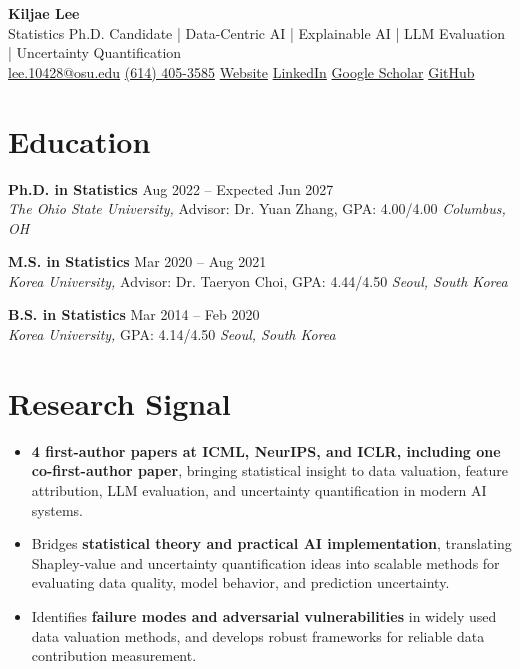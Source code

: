 \documentclass[letterpaper,10pt]{article}
\newcommand{\eduline}[5]{%
  \textbf{#1} \hfill {\color{muted}#2}\\
  \textit{#3}#4 \hfill \textit{#5}\par\vspace{4pt}
}
\begin{document}
{\huge\bfseries Kiljae Lee}\\[2pt]
{\color{accent}Statistics Ph.D. Candidate | Data-Centric AI | Explainable AI | LLM Evaluation | Uncertainty Quantification}\\[3.5pt]
\href{mailto:lee.10428@osu.edu}{lee.10428@osu.edu} \quad
\href{tel:+16144053585}{(614) 405-3585} \quad
\href{https://kiljaeL.github.io}{Website} \quad
\href{https://www.linkedin.com/in/kiljaelee}{LinkedIn} \quad
\href{https://scholar.google.com/citations?user=UsRBPmUAAAAJ&hl=en&oi=sra}{Google Scholar} \quad
\href{https://github.com/kiljael}{GitHub}
\vspace{-4.2pt}

\section{Education}
\eduline
  {Ph.D. in Statistics}
  {Aug 2022 -- Expected Jun 2027}
  {The Ohio State University,}
  { Advisor: Dr. Yuan Zhang, GPA: 4.00/4.00}
  {Columbus, OH}
\eduline
  {M.S. in Statistics}
  {Mar 2020 -- Aug 2021}
  {Korea University,}
  { Advisor: Dr. Taeryon Choi, GPA: 4.44/4.50}
  {Seoul, South Korea}
\eduline
  {B.S. in Statistics}
  {Mar 2014 -- Feb 2020}
  {Korea University,}
  { GPA: 4.14/4.50}
  {Seoul, South Korea}
\vspace{-5.8pt}

\section{Research Signal}
\begin{itemize}
  \item \textbf{4 first-author papers at ICML, NeurIPS, and ICLR, including one co-first-author paper}, bringing statistical insight to data valuation, feature attribution, LLM evaluation, and uncertainty quantification in modern AI systems.
  \item Bridges \textbf{statistical theory and practical AI implementation}, translating Shapley-value and uncertainty quantification ideas into scalable methods for evaluating data quality, model behavior, and prediction uncertainty.
  \item Identifies \textbf{failure modes and adversarial vulnerabilities} in widely used data valuation methods, and develops robust frameworks for reliable data contribution measurement.
\end{itemize}
\end{document}
